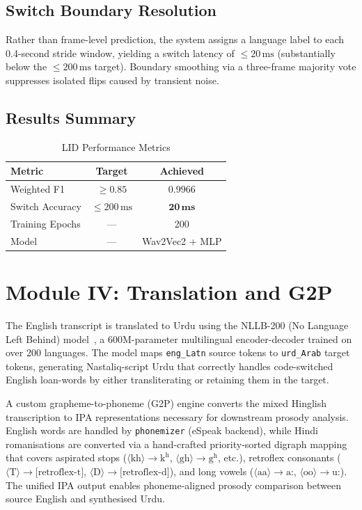 \documentclass[10pt,twocolumn]{article}
\begin{document}
\subsection{Switch Boundary Resolution}

Rather than frame-level prediction, the system assigns a language label to each 0.4-second stride window, yielding a switch latency of $\leq 20\,\text{ms}$ (substantially below the $\leq 200\,\text{ms}$ target). Boundary smoothing via a three-frame majority vote suppresses isolated flips caused by transient noise.

\subsection{Results Summary}

\begin{table}[H]
\centering
\caption{LID Performance Metrics}
\label{tab:lid}
\begin{tabular}{lcc}
\toprule
\textbf{Metric} & \textbf{Target} & \textbf{Achieved} \\
\midrule
Weighted F1 & $\geq 0.85$ & $\mathbf{0.9966}$ \\
Switch Accuracy & $\leq 200\,\text{ms}$ & $\mathbf{20\,\text{ms}}$ \\
Training Epochs & --- & 200 \\
Model & --- & Wav2Vec2 + MLP \\
\bottomrule
\end{tabular}
\end{table}

\section{Module IV: Translation and G2P}\label{sec:translate}

The English transcript is translated to Urdu using the NLLB-200 (No Language Left Behind) model~\cite{costa2022no}, a 600M-parameter multilingual encoder-decoder trained on over 200 languages. The model maps \texttt{eng\_Latn} source tokens to \texttt{urd\_Arab} target tokens, generating Nastaliq-script Urdu that correctly handles code-switched English loan-words by either transliterating or retaining them in the target.

A custom grapheme-to-phoneme (G2P) engine converts the mixed Hinglish transcription to IPA representations necessary for downstream prosody analysis. English words are handled by \texttt{phonemizer} (eSpeak backend), while Hindi romanisations are converted via a hand-crafted priority-sorted digraph mapping that covers aspirated stops ($\langle\text{kh}\rangle \to \text{k}^\text{h}$, $\langle\text{gh}\rangle \to \text{g}^\text{h}$, etc.), retroflex consonants ($\langle\text{T}\rangle \to \text{[retroflex-t]}$, $\langle\text{D}\rangle \to \text{[retroflex-d]}$), and long vowels ($\langle\text{aa}\rangle \to \text{a:}$, $\langle\text{oo}\rangle \to \text{u:}$). The unified IPA output enables phoneme-aligned prosody comparison between source English and synthesised Urdu.
\end{document}
